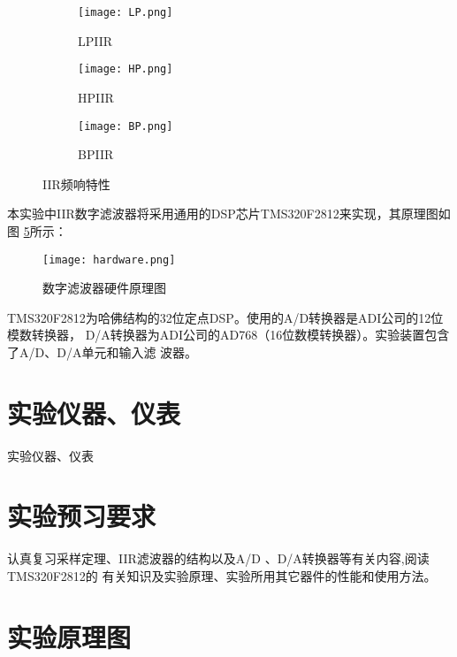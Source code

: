 \documentclass[../main]{subfiles}
\begin{document}
\begin{figure}[htbp]
	\centering
	\begin{subfigure}[htbp]{.45\linewidth}
		\centering
		\texttt{[image: LP.png]}
		\caption{LPIIR}
		\label{fig:LPIIR}
	\end{subfigure}
	\quad
	\begin{subfigure}[htbp]{.45\linewidth}
		\centering
		\texttt{[image: HP.png]}
		\caption{HPIIR}
		\label{fig:HPIIR}
	\end{subfigure}

	\begin{subfigure}[htbp]{.45\linewidth}
		\centering
		\texttt{[image: BP.png]}
		\caption{BPIIR}
		\label{fig:BPIIR}
	\end{subfigure}
	\caption{IIR频响特性}
	\label{fig:IIR频响特性}
\end{figure}

本实验中IIR数字滤波器将采用通用的DSP芯片TMS320F2812来实现，其原理图如图
\ref{fig:数字滤波器硬件原理图}所示：

\begin{figure}[htbp]
	\centering
	\texttt{[image: hardware.png]}
	\caption{数字滤波器硬件原理图}
	\label{fig:数字滤波器硬件原理图}
\end{figure}

TMS320F2812为哈佛结构的32位定点DSP。使用的A/D转换器是ADI公司的12位模数转换器，
D/A转换器为ADI公司的AD768（16位数模转换器）。实验装置包含了A/D、D/A单元和输入滤
波器。

\section{实验仪器、仪表}%
\label{sec:\arabic{chapter}实验仪器、仪表}

\begin{table}[htbp]
	\centering
	\caption{实验仪器、仪表}
	\label{tab:实验仪器、仪表}
\end{table}

\section{实验预习要求}%
\label{sec:\arabic{chapter}实验预习要求}

认真复习采样定理、IIR滤波器的结构以及A/D 、D/A转换器等有关内容,阅读TMS320F2812的
有关知识及实验原理、实验所用其它器件的性能和使用方法。

\section{实验原理图}%
\label{sec:\arabic{chapter}实验原理图}
\end{document}
